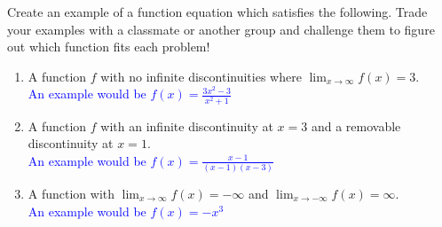 \documentclass{ximera}
\begin{document}
\begin{exercise}
    

 Create an example of a function equation which satisfies the following.  Trade your examples with a classmate or another group and challenge them to figure out which function fits each problem! 
 \begin{enumerate}
    \item A function $f$ with no infinite discontinuities where $\displaystyle\lim_{x\rightarrow \infty}f(x)=3$. \\
    \textcolor{blue}{ An example would be $f(x)=\frac{3x^2-3}{x^2+1}$}

    \item A function $f$ with an infinite discontinuity at $x=3$ and a removable discontinuity at $x=1$.\\
    \textcolor{blue}{An example would be $f(x)=\frac{x-1}{(x-1)(x-3)}$}
    
    \item A function with $\displaystyle\lim_{x\rightarrow \infty}f(x)=-\infty$ and $\displaystyle\lim_{x\rightarrow -\infty}f(x)=\infty$.\\
    \textcolor{blue}{ An example would be $f(x)=-x^3$}
 \end{enumerate}

\end{exercise}
\end{document}
